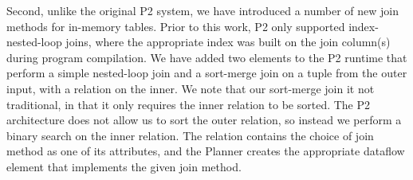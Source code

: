 Second, unlike the original P2 system, we have introduced a number of new join
methods for in-memory tables.  Prior to this work, P2 only supported
index-nested-loop joins, where the appropriate index was built on the join
column(s) during program compilation.  We have added two elements to the P2
runtime that perform a simple nested-loop join and a sort-merge join on a tuple
from the outer input, with a relation on the inner.  We note that our
sort-merge join it not traditional, in that it only requires the inner relation
to be sorted.  The P2 architecture does not allow us to sort the outer
relation, so instead we perform a binary search on the inner relation.  The
 relation contains the choice of join method as one of its
attributes, and the Planner creates the appropriate dataflow element that
implements the given join method.



